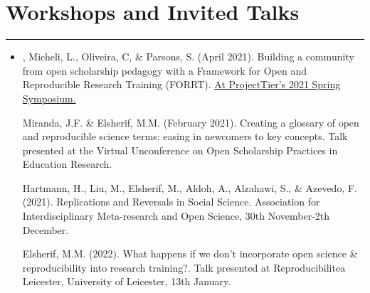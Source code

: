 \documentclass[letterpaper]{article}
\begin{document}
\section*{\color{Brown} Workshops and Invited Talks}
\vspace{-.5em}
\hrule
\vspace{1em}
\begin{itemize}


\item[] {, Micheli, L., Oliveira, C, \& Parsons, S. (April 2021). Building a community from open scholarship pedagogy with a Framework for Open and Reproducible Research Training (FORRT).  \href{https://www.projecttier.org/fellowships-and-workshops/2021-spring-symposium/}{\color{BlueViolet}At ProjectTier's 2021 Spring Symposium.}}

Miranda, J.F. \& Elsherif, M.M. (February 2021). Creating a glossary of open and reproducible science terms: easing in newcomers to key concepts. Talk presented at the Virtual Unconference on Open Scholarship Practices in Education Research.

Hartmann, H., Liu, M., Elsherif, M., Aldoh, A., Alzahawi, S., & Azevedo, F. (2021). Replications and Reversals in Social Science. Association for Interdisciplinary Meta-research and Open Science, 30th November-2th December.

Elsherif, M.M. (2022). What happens if we don’t incorporate open science & reproducibility into research training?. Talk presented at Reproducibilitea Leicester, University of Leicester, 13th January.

\end{itemize}
\end{document}
